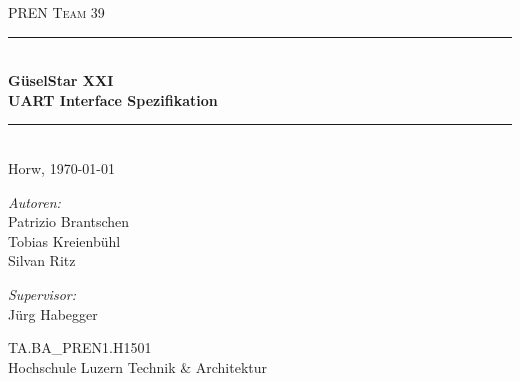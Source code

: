 \begin{titlepage}   

\begin{center}
\textsc{\Large PREN Team 39}\\[0.5cm]

\newcommand{\HRule}{\rule{\linewidth}{0.5mm}}
\HRule \\[0.4cm]
{ \huge \bfseries GüselStar XXI}\\[0.4cm]
{ \LARGE \bfseries UART Interface Spezifikation}\\[0.4cm]
\HRule \\[1.5cm]

{\large Horw, \today}

\begin{minipage}{0.4\textwidth}
\begin{flushleft} \large
\emph{Autoren:}\\
Patrizio Brantschen\\
Tobias Kreienbühl\\
Silvan Ritz
\end{flushleft}
\end{minipage}
\hfill
\begin{minipage}{0.4\textwidth}
\begin{flushright} \large
\emph{Supervisor:} \\
Jürg Habegger
\end{flushright}
\end{minipage}
\large
\vfill
TA.BA\_PREN1.H1501 \\
Hochschule Luzern Technik \& Architektur

\end{center}

\end{titlepage}